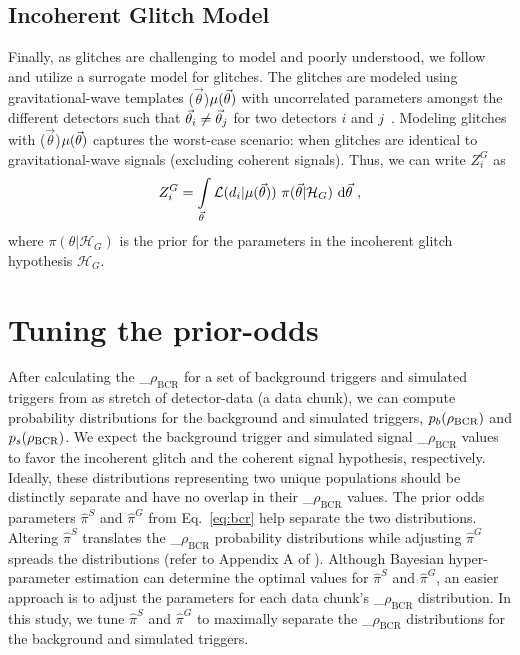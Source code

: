 \documentclass[
 nofootinbib,
 amsmath,amssymb,
 aps,
 twocolumn,
 superscriptaddress
]{revtex4-2}
\newcommand{\mathcmd}[1]{{\sc \relax\ifmmode#1\else $#1$\fi}\xspace}
\newcommand{\bcr}{\mathcmd{\rho_\text{BCR}}}
\newcommand{\parameters}{\mathcmd{\vec{\theta}}}
\newcommand{\template}{\mathcmd{\mu(\parameters)}}
\begin{document}
\subsection{Incoherent Glitch Model}
Finally, as glitches are challenging to model and poorly understood, we follow \citet{bci} and utilize a surrogate model for glitches. The glitches are modeled using gravitational-wave templates  \template with uncorrelated parameters amongst the different detectors such that  $\parameters_i \neq \parameters_j$ for two detectors $i$ and $j$~\cite{bci}.  Modeling glitches with \template captures the worst-case scenario: when glitches are identical to gravitational-wave signals (excluding coherent signals). Thus, we can write $Z^G_i$ as 
\begin{equation}
\label{eq:zg}
Z^G_i = \int\limits_{\parameters} \mathcal{L}(d_i|\template)\ \pi(\parameters| \mathcal{H}_G)\  \text{d}\parameters  \ ,
\end{equation}
where $\pi(\theta| \mathcal{H}_G)$ is the prior for the parameters in the incoherent glitch hypothesis $\mathcal{H}_G$. 



\section{Tuning the prior-odds}\label{apdx:tuning-prior-odds}

After calculating the \bcr for a set of background triggers and simulated triggers from as stretch of detector-data (a data chunk), we can compute probability distributions for the background and simulated triggers, $p_b(\bcr)$ and $p_s(\bcr)$. We expect the background trigger and simulated signal \bcr values to favor the incoherent glitch and the coherent signal hypothesis, respectively. Ideally, these distributions representing two unique populations should be distinctly separate and have no overlap in their \bcr values. The prior odds parameters $\hat{\pi}^S$ and $\hat{\pi}^G$ from Eq.~\ref{eq:bcr} help separate the two distributions. Altering $\hat{\pi}^S$ translates the \bcr probability distributions while adjusting $\hat{\pi}^G$ spreads the distributions (refer to Appendix A of \citet{BCR1}). Although Bayesian hyper-parameter estimation can determine the optimal values for $\hat{\pi}^S$ and $\hat{\pi}^G$, an easier approach is to adjust the parameters for each data chunk's \bcr distribution. In this study, we tune $\hat{\pi}^S$ and $\hat{\pi}^G$ to maximally separate the \bcr distributions for the background and simulated triggers. 
\end{document}
